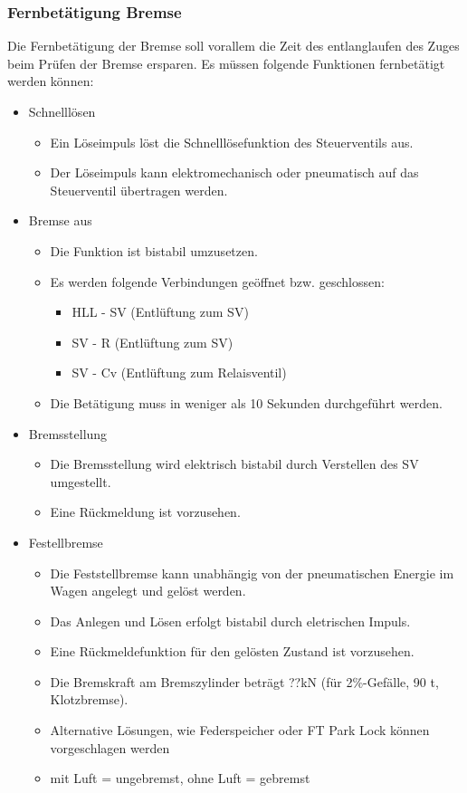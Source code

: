 \subsubsection{Fernbetätigung Bremse}
Die Fernbetätigung der Bremse soll vorallem die Zeit des entlanglaufen des Zuges beim Prüfen der Bremse ersparen. Es müssen folgende Funktionen fernbetätigt werden können:
\begin{itemize}
    \item Schnelllösen
    \begin{itemize}
        \item Ein Löseimpuls löst die Schnelllösefunktion des Steuerventils aus.
        \item Der Löseimpuls kann elektromechanisch oder pneumatisch auf das Steuerventil übertragen werden.
    \end{itemize}
    \item Bremse aus
    \begin{itemize}
        \item Die Funktion ist bistabil umzusetzen.
        \item 	Es werden folgende Verbindungen geöffnet bzw. geschlossen:
        \begin{itemize}
            \item HLL - SV (Entlüftung zum SV)
            \item SV - R (Entlüftung zum SV)
            \item SV - Cv (Entlüftung zum Relaisventil)
        \end{itemize}
        \item Die Betätigung muss in weniger als 10 Sekunden durchgeführt werden.
    \end{itemize}
    \item Bremsstellung
    \begin{itemize}
        \item Die Bremsstellung wird elektrisch bistabil durch Verstellen des SV umgestellt.
        \item Eine Rückmeldung ist vorzusehen.
    \end{itemize}
    \item Festellbremse
    \begin{itemize}
        \item Die Feststellbremse kann unabhängig von der pneumatischen Energie im Wagen angelegt und gelöst werden.
        \item Das Anlegen und Lösen erfolgt bistabil durch eletrischen Impuls.
        \item Eine Rückmeldefunktion für den gelösten Zustand ist vorzusehen.
        \item Die Bremskraft am Bremszylinder beträgt ??kN (für 2\%-Gefälle, 90 t, Klotzbremse).
        \item Alternative Lösungen, wie Federspeicher oder FT Park Lock können vorgeschlagen werden
        \item mit Luft = ungebremst, ohne Luft = gebremst
    \end{itemize}
\end{itemize}

